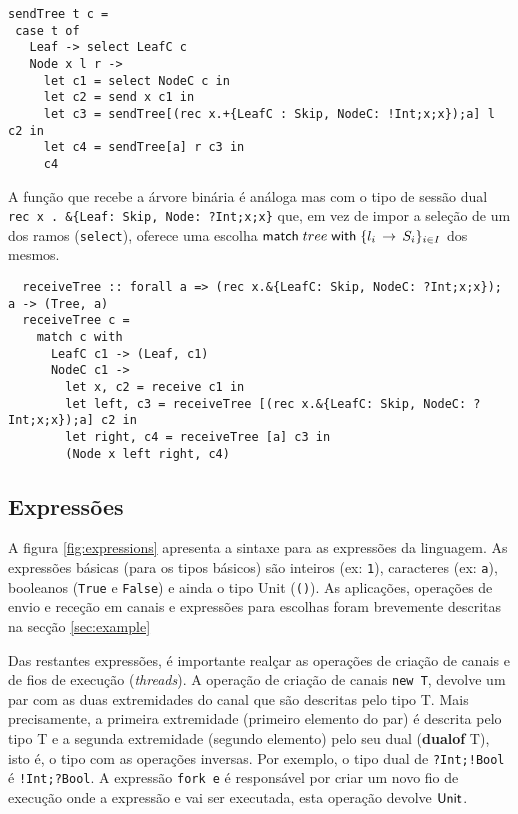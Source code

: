 \begin{lstlisting}
sendTree t c =
 case t of
   Leaf -> select LeafC c
   Node x l r ->
     let c1 = select NodeC c in
     let c2 = send x c1 in
     let c3 = sendTree[(rec x.+{LeafC : Skip, NodeC: !Int;x;x});a] l c2 in
     let c4 = sendTree[a] r c3 in
     c4

\end{lstlisting}

A função que recebe a árvore binária é análoga mas com o tipo de sessão dual \lstinline"rec x . &{Leaf: Skip, Node: ?Int;x;x}" que, em vez de impor a seleção de um dos ramos (\lstinline"select"), oferece uma escolha $\mathsf{match}\;tree\;\mathsf{with}\;\{l_i\,\to\,S_i\}_{i\in I}$ dos mesmos.
\begin{lstlisting}
  receiveTree :: forall a => (rec x.&{LeafC: Skip, NodeC: ?Int;x;x}); a -> (Tree, a)
  receiveTree c =
    match c with
      LeafC c1 -> (Leaf, c1)
      NodeC c1 ->
        let x, c2 = receive c1 in
        let left, c3 = receiveTree [(rec x.&{LeafC: Skip, NodeC: ?Int;x;x});a] c2 in
        let right, c4 = receiveTree [a] c3 in
        (Node x left right, c4)
\end{lstlisting}


\subsection{Expressões}
A figura \ref{fig:expressions} apresenta a sintaxe para as expressões da linguagem. As expressões básicas (para os tipos básicos) são inteiros (ex: \lstinline"1"), caracteres (ex: \lstinline"a"), booleanos (\lstinline"True" e \lstinline"False") e ainda o tipo Unit (\lstinline|()|).
As aplicações, operações de envio e receção em canais e expressões para escolhas foram brevemente descritas na secção \ref{sec:example}

Das restantes expressões, é importante realçar as operações de criação de canais e de fios de execução (\textit{threads}).
A operação de criação de canais \lstinline"new T", devolve um par com as duas extremidades do canal que são descritas pelo tipo T. Mais precisamente, a primeira extremidade (primeiro elemento do par) é descrita pelo tipo T e a segunda extremidade (segundo elemento) pelo seu dual (\textbf{dualof} T), isto é, o tipo com as operações inversas. Por exemplo, o tipo dual de \lstinline|?Int;!Bool| é \lstinline|!Int;?Bool|.
A expressão \lstinline"fork e" é responsável por criar um novo fio de execução onde a expressão e vai ser executada, esta operação devolve $\mathsf{Unit}$.

